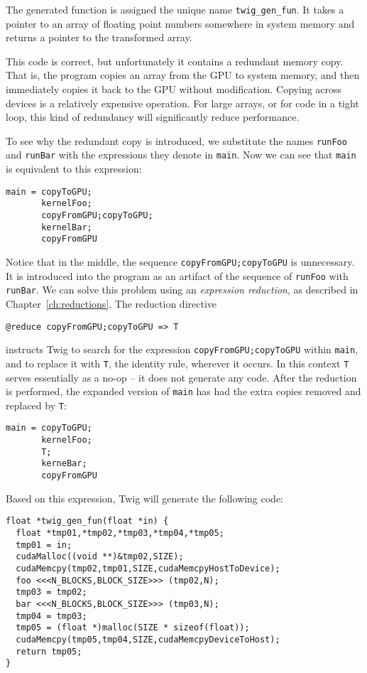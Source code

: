 The generated function is assigned the unique name \texttt{twig\_gen\_fun}. It
takes a pointer to an array of floating point numbers somewhere in system
memory and returns a pointer to the transformed array.

This code is correct, but unfortunately it contains a redundant
memory copy. That is, the program copies an array from the GPU to
system memory, and then immediately copies it back to the GPU
without modification. Copying across devices is a relatively
expensive operation. For large arrays, or for code in a tight
loop, this kind of redundancy will significantly reduce
performance.

To see why the redundant copy is introduced, we substitute the
names \texttt{runFoo} and \texttt{runBar} with the expressions
they denote in \texttt{main}. Now we can see that \texttt{main} is
equivalent to this expression:

\begin{verbatim}
main = copyToGPU;
       kernelFoo;
       copyFromGPU;copyToGPU;
       kernelBar;
       copyFromGPU
\end{verbatim}

Notice that in the middle, the sequence
\texttt{copyFromGPU;copyToGPU} is unnecessary. It is introduced
into the program as an artifact of the sequence of \texttt{runFoo}
with \texttt{runBar}. We can solve this problem using an
\emph{expression reduction}, as described in
Chapter~\ref{ch:reductions}. The reduction directive

\begin{verbatim}
@reduce copyFromGPU;copyToGPU => T
\end{verbatim}

\noindent instructs Twig to search for the expression
\texttt{copyFromGPU;copyToGPU} within \texttt{main}, and to
replace it with \texttt{T}, the identity rule, wherever it occurs.
In this context \texttt{T} serves essentially as a no-op -- it
does not generate any code. After the reduction is performed, the
expanded version of \texttt{main} has had the extra copies removed
and replaced by \texttt{T}:

\begin{verbatim}
main = copyToGPU;
       kernelFoo;
       T;
       kerneBar;
       copyFromGPU
\end{verbatim}

Based on this expression, Twig will generate the following code:

\begin{verbatim}
float *twig_gen_fun(float *in) {
  float *tmp01,*tmp02,*tmp03,*tmp04,*tmp05;
  tmp01 = in;
  cudaMalloc((void **)&tmp02,SIZE);
  cudaMemcpy(tmp02,tmp01,SIZE,cudaMemcpyHostToDevice);
  foo <<<N_BLOCKS,BLOCK_SIZE>>> (tmp02,N);
  tmp03 = tmp02;
  bar <<<N_BLOCKS,BLOCK_SIZE>>> (tmp03,N);
  tmp04 = tmp03;
  tmp05 = (float *)malloc(SIZE * sizeof(float));
  cudaMemcpy(tmp05,tmp04,SIZE,cudaMemcpyDeviceToHost);
  return tmp05;
}\end{verbatim}

